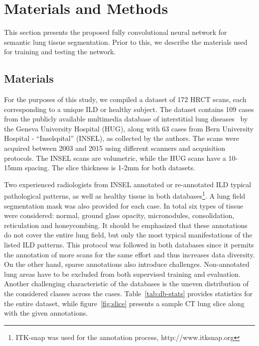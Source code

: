 \documentclass[journal]{IEEEtran}
\begin{document}
\section{Materials and Methods}
This section presents the proposed fully convolutional neural network for semantic lung tissue segmentation. Prior to this, we describe the materials used for training and testing the network.

\subsection{Materials}
For the purposes of this study, we compiled a dataset of 172 HRCT scans, each corresponding to a unique ILD or healthy subject. The dataset contains 109 cases from the publicly available multimedia database of interstitial lung diseases~\cite{depeursinge2012building} by the Geneva University Hospital (HUG), along with 63 cases from Bern University Hospital - ``Inselspital'' (INSEL), as collected by the authors. The scans were acquired between 2003 and 2015 using different scanners and acquisition protocols. The INSEL scans are volumetric, while the HUG scans have a 10-15mm spacing. The slice thickness is 1-2mm for both datasets.


Two experienced radiologists from INSEL annotated or re-annotated ILD typical pathological patterns, as well as healthy tissue in both databases\footnote{ITK-snap was used for the annotation process, http://www.itksnap.org}. A lung field segmentation mask was also provided for each case. In total six types of tissue were considered: normal, ground glass opacity, micronodules, consolidation, reticulation and honeycombing. It should be emphasized that these annotations do not cover the entire lung field, but only the most typical manifestations of the listed ILD patterns. This protocol was followed in both databases since it permits the annotation of more scans for the same effort and thus increases data diversity. On the other hand, sparse annotations also introduce challenges. Non-annotated lung areas have to be excluded from both supervised training and evaluation. Another challenging characteristic of the databases is the uneven distribution of the considered classes across the cases. Table~\ref{tab:db-stats} provides statistics for the entire dataset, while figure~\ref{fig:slice} presents a sample CT lung slice along with the given annotations.
\end{document}
